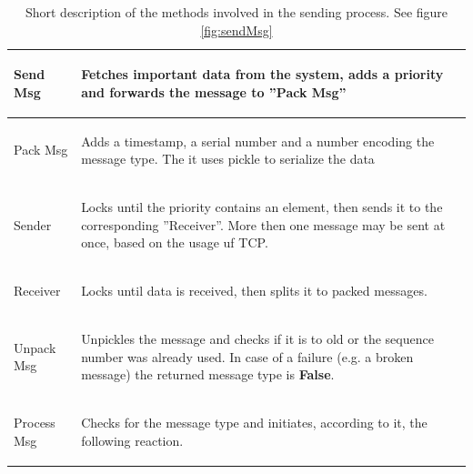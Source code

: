 \documentclass[]{scrreprt}
\begin{document}
	\begin{table}
		\centering
		
		\begin{tabular}{|l|l|}
			\hline
			Send Msg & \begin{pbox}{11.0cm}{\vspace{.2\baselineskip}
					Fetches important data from the system, adds a priority and forwards the message to ''Pack Msg''
					\vspace{.3\baselineskip}} 
			\end{pbox}\\
			\hline 
			Pack Msg & 
			\begin{pbox}{11.0cm}{\vspace{.2\baselineskip}
				Adds a timestamp, a serial number and a number encoding the message type. The it uses pickle to serialize the data
				\vspace{.3\baselineskip}} 
		\end{pbox}\\
			\hline
			Sender &
			\begin{pbox}{11.0cm}{\vspace{.2\baselineskip}
				Locks until the priority contains an element, then sends it to the corresponding ''Receiver''. More then one message may be sent at once, based on the usage uf TCP.\vspace{.3\baselineskip}}
			\end{pbox}\\
			\hline
			Receiver &
			\begin{pbox}{11.0cm}{\vspace{.2\baselineskip}
				Locks until data is received, then splits it to packed messages. \vspace{.3\baselineskip}}
			\end{pbox}\\
			\hline
			Unpack Msg &
			\begin{pbox}{11.0cm}{\vspace{.2\baselineskip}
				Unpickles the message and checks if it is to old or the sequence number was already used. In case of a failure (e.g. a broken message) the returned message type is \textbf{False}.
				\vspace{.3\baselineskip}}
			\end{pbox}\\
			\hline
			Process Msg &
			\begin{pbox}{11.0cm}{\vspace{.2\baselineskip}
				Checks for the message type and initiates, according to it, the following reaction.
				\vspace{.3\baselineskip}}
			\end{pbox}\\
			\hline
		\end{tabular}
	\caption{Short description of the methods involved in the sending process.
		See figure \ref{fig:sendMsg}}
	\label{tab:sendMsg}
	\end{table}
\end{document}
